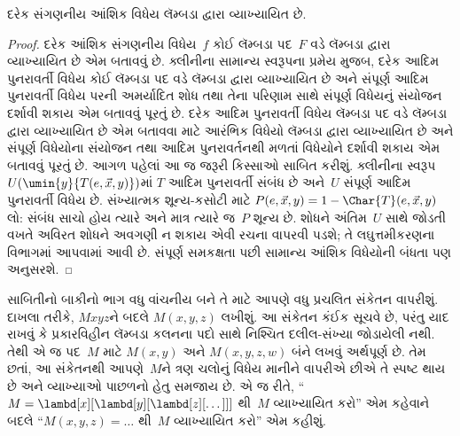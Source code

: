 \begingroup
\makeatletter{}\makeatother

\label{guunit:OLP-0350}


\begin{thm}
દરેક સંગણનીય આંશિક વિધેય લૅમ્બડા દ્વારા વ્યાખ્યાયિત છે.
\end{thm}

\begin{proof}
દરેક આંશિક સંગણનીય વિધેય~$f$ કોઈ લૅમ્બડા પદ~$F$ વડે
લૅમ્બડા દ્વારા વ્યાખ્યાયિત છે એમ બતાવવું છે. ક્લીનીના સામાન્ય સ્વરૂપના
પ્રમેય મુજબ, દરેક આદિમ પુનરાવર્તી વિધેય કોઈ લૅમ્બડા પદ વડે
લૅમ્બડા દ્વારા વ્યાખ્યાયિત છે અને સંપૂર્ણ આદિમ પુનરાવર્તી વિધેય પરની અમર્યાદિત
શોધ તથા તેના પરિણામ સાથે સંપૂર્ણ વિધેયનું સંયોજન દર્શાવી શકાય
એમ બતાવવું પૂરતું છે.
દરેક આદિમ પુનરાવર્તી વિધેય લૅમ્બડા પદ વડે લૅમ્બડા દ્વારા વ્યાખ્યાયિત
છે એમ બતાવવા માટે આરંભિક વિધેયો લૅમ્બડા દ્વારા વ્યાખ્યાયિત છે અને
સંપૂર્ણ વિધેયોના સંયોજન તથા આદિમ પુનરાવર્તનથી મળતાં વિધેયોને
દર્શાવી શકાય એમ બતાવવું પૂરતું છે. આગળ પહેલાં આ જ જરૂરી કિસ્સાઓ
સાબિત કરીશું. ક્લીનીના સ્વરૂપ~$U(\umin{y}{T(e,\vec x,y)})$માં
$T$ આદિમ પુનરાવર્તી સંબંધ છે અને~$U$ સંપૂર્ણ આદિમ પુનરાવર્તી
વિધેય છે. સંખ્યાત્મક શૂન્ય-કસોટી માટે
$P(e,\vec x,y)=1-\Char{T}(e,\vec x,y)$ લો: સંબંધ સાચો હોય
ત્યારે અને માત્ર ત્યારે જ~$P$ શૂન્ય છે. શોધને અંતિમ~$U$ સાથે
જોડતી વખતે અવિરત શોધને અવગણી ન શકાય એવી રચના વાપરવી પડશે;
તે લઘુત્તમીકરણના વિભાગમાં આપવામાં આવી છે. સંપૂર્ણ સમકક્ષતા
પછી સામાન્ય આંશિક વિધેયોની બંધતા પણ અનુસરશે.
\end{proof}

સાબિતીનો બાકીનો ભાગ વધુ વાંચનીય બને તે માટે આપણે વધુ પ્રચલિત
સંકેતન વાપરીશું. દાખલા તરીકે, $Mxyz$ને બદલે $M(x, y, z)$ લખીશું.
આ સંકેતન કંઈક સૂચવે છે, પરંતુ યાદ રાખવું કે પ્રકારવિહીન લૅમ્બડા
કલનના પદો સાથે નિશ્ચિત દલીલ-સંખ્યા જોડાયેલી નથી. તેથી એ જ
પદ~$M$ માટે $M(x,y)$ અને $M(x,y,z,w)$ બંને લખવું અર્થપૂર્ણ છે.
તેમ છતાં, આ સંકેતનથી આપણે~$M$ને ત્રણ ચલોનું વિધેય માનીને
વાપરીએ છીએ તે સ્પષ્ટ થાય છે અને વ્યાખ્યાઓ પાછળનો હેતુ સમજાય છે.
એ જ રીતે, ``$M = \lambd[x][\lambd[y][\lambd[z][\dots]]]$
થી~$M$ વ્યાખ્યાયિત કરો'' એમ કહેવાને બદલે ``$M(x,y,z) = \dots$
થી~$M$ વ્યાખ્યાયિત કરો'' એમ કહીશું.
\endgroup


\begingroup
\makeatletter{}\makeatother

\label{guunit:OLP-0351}


